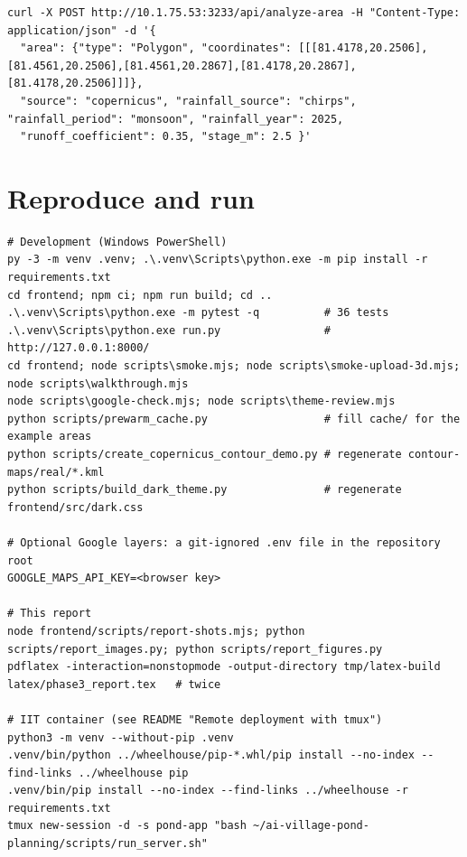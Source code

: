 \documentclass[11pt,a4paper]{article}
\begin{document}
\begin{lstlisting}
curl -X POST http://10.1.75.53:3233/api/analyze-area -H "Content-Type: application/json" -d '{
  "area": {"type": "Polygon", "coordinates": [[[81.4178,20.2506],[81.4561,20.2506],[81.4561,20.2867],[81.4178,20.2867],[81.4178,20.2506]]]},
  "source": "copernicus", "rainfall_source": "chirps", "rainfall_period": "monsoon", "rainfall_year": 2025,
  "runoff_coefficient": 0.35, "stage_m": 2.5 }'
\end{lstlisting}

\section{Reproduce and run}
\label{app:run}
\begin{lstlisting}
# Development (Windows PowerShell)
py -3 -m venv .venv; .\.venv\Scripts\python.exe -m pip install -r requirements.txt
cd frontend; npm ci; npm run build; cd ..
.\.venv\Scripts\python.exe -m pytest -q          # 36 tests
.\.venv\Scripts\python.exe run.py                # http://127.0.0.1:8000/
cd frontend; node scripts\smoke.mjs; node scripts\smoke-upload-3d.mjs; node scripts\walkthrough.mjs
node scripts\google-check.mjs; node scripts\theme-review.mjs
python scripts/prewarm_cache.py                  # fill cache/ for the example areas
python scripts/create_copernicus_contour_demo.py # regenerate contour-maps/real/*.kml
python scripts/build_dark_theme.py               # regenerate frontend/src/dark.css

# Optional Google layers: a git-ignored .env file in the repository root
GOOGLE_MAPS_API_KEY=<browser key>

# This report
node frontend/scripts/report-shots.mjs; python scripts/report_images.py; python scripts/report_figures.py
pdflatex -interaction=nonstopmode -output-directory tmp/latex-build latex/phase3_report.tex   # twice

# IIT container (see README "Remote deployment with tmux")
python3 -m venv --without-pip .venv
.venv/bin/python ../wheelhouse/pip-*.whl/pip install --no-index --find-links ../wheelhouse pip
.venv/bin/pip install --no-index --find-links ../wheelhouse -r requirements.txt
tmux new-session -d -s pond-app "bash ~/ai-village-pond-planning/scripts/run_server.sh"
\end{lstlisting}

\end{document}
